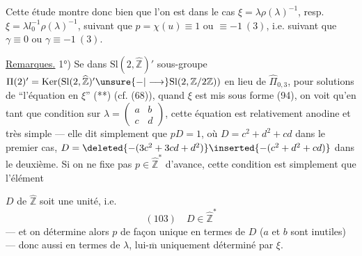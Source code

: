 Cette étude montre donc bien que l'on est dans le cas $\xi=\lambda\rho(\lambda)^{-1}$, resp. $\xi=\lambda l_0^{-1}\rho(\lambda)^{-1}$, suivant que $p=\chi(u)\equiv1$ ou $\equiv-1\ (3)$, i.e. suivant que $\gamma\equiv0$ ou $\gamma\equiv-1\ (3)$.

\uline{Remarques.} 1°) Se  dans $\mathrm{Sl}(2,\widehat{\mathbb Z})'$    sous-groupe $\Pi(2)'=\operatorname{Ker}(\mathrm{Sl}(2,\widehat{\mathbb Z})'\unsure{-|\longrightarrow}\mathrm{Sl}(2,\mathbb Z/2\mathbb Z))$ en lieu de $\widehat{\Pi}_{0,3}$, pour   solutions de ``l'équation en $\xi$'' (**) (cf. (68)), quand $\xi$ est mis sous forme  (94), on voit qu'en tant que condition sur $\lambda=\begin{pmatrix}a&b\\c&d\end{pmatrix}$, cette équation est relativement anodine et très simple --- elle dit simplement que $pD=1$, où $D=c^2+d^2+cd$ dans le premier cas, $D=\deleted{-(3c^2+3cd+d^2)}\inserted{-(c^2+d^2+cd)}$ dans le deuxième. Si on ne fixe pas $p\in\widehat{\mathbb Z}^{*}$ d'avance, cette condition est simplement que l'élément


$D$ de $\widehat{\mathbb Z}$ soit une unité, i.e.
\[
(103)\quad D\in\widehat{\mathbb Z}^{*}
\]
--- et on détermine alors $p$ de façon unique en termes de $D$  ($a$ et $b$ sont inutiles) --- donc aussi en termes de $\lambda$, lui-$\overline{\mathrm m}$ uniquement déterminé par $\xi$.

